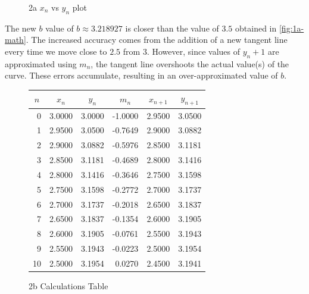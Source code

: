 \documentclass[answers,addpoints]{exam}
\begin{document}
\begin{questions}
\begin{solution}
    \begin{figure}[H]
      \centering
      \caption{2a $x_n$ vs $y_n$ plot}
      \label{fig:2a-vii-plot}
    \end{figure}

    The new $b$ value of $b \approx 3.218927$ is closer than the value of $3.5$ obtained in \ref{fig:1a-math}. The increased accuracy comes from the addition of a new tangent line every time we move close to $2.5$ from $3$. However, since values of $y_n+1$ are approximated using $m_n$, the tangent line overshoots the actual value(s) of the curve. These errors accumulate, resulting in an over-approximated value of $b$.

    \begin{figure}[H]
      \centering
      \begin{tabular}{r r r r r r}
        \hline
        \multicolumn{1}{c}{$n$} &
        \multicolumn{1}{c}{$x_n$} &
        \multicolumn{1}{c}{$y_n$} &
        \multicolumn{1}{c}{$m_n$} &
        \multicolumn{1}{c}{$x_{n+1}$} &
        \multicolumn{1}{c}{$y_{n+1}$} \\
        \hline
        0 & 3.0000 & 3.0000 & -1.0000 & 2.9500 & 3.0500 \\
        1 & 2.9500 & 3.0500 & -0.7649 & 2.9000 & 3.0882 \\
        2 & 2.9000 & 3.0882 & -0.5976 & 2.8500 & 3.1181 \\
        3 & 2.8500 & 3.1181 & -0.4689 & 2.8000 & 3.1416 \\
        4 & 2.8000 & 3.1416 & -0.3646 & 2.7500 & 3.1598 \\
        5 & 2.7500 & 3.1598 & -0.2772 & 2.7000 & 3.1737 \\
        6 & 2.7000 & 3.1737 & -0.2018 & 2.6500 & 3.1837 \\
        7 & 2.6500 & 3.1837 & -0.1354 & 2.6000 & 3.1905 \\
        8 & 2.6000 & 3.1905 & -0.0761 & 2.5500 & 3.1943 \\
        9 & 2.5500 & 3.1943 & -0.0223 & 2.5000 & 3.1954 \\
        10 & 2.5000 & 3.1954 & 0.0270 & 2.4500 & 3.1941 \\
        \hline
      \end{tabular}
      \caption{2b Calculations Table}
      \label{fig:2b-table}
    \end{figure}


\end{solution}
\end{questions}
\end{document}
